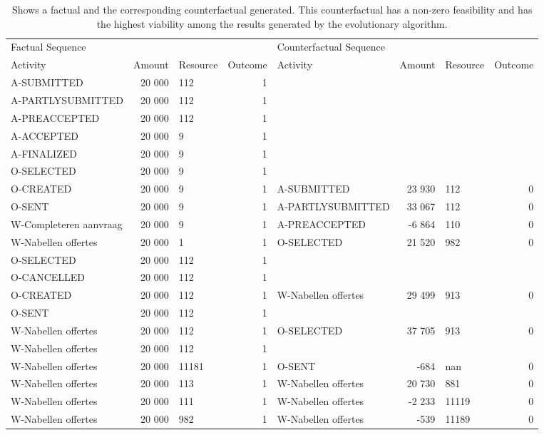 \begin{table}
\caption{Shows a factual and the corresponding counterfactual generated. This counterfactual has a non-zero feasibility and has the highest viability among the results generated by the evolutionary algorithm.}
\label{tbl:example-cf-evo-feasibility}
\begin{tabular}{lrlrlrlr}
\toprule
\multicolumn{4}{l}{Factual Sequence} & \multicolumn{4}{l}{Counterfactual Sequence} \\
Activity & Amount & Resource & Outcome & Activity & Amount & Resource & Outcome \\
\midrule
A-SUBMITTED & 20 000 & 112 & 1 &  &  &  &  \\
A-PARTLYSUBMITTED & 20 000 & 112 & 1 &  &  &  &  \\
A-PREACCEPTED & 20 000 & 112 & 1 &  &  &  &  \\
A-ACCEPTED & 20 000 & 9 & 1 &  &  &  &  \\
A-FINALIZED & 20 000 & 9 & 1 &  &  &  &  \\
O-SELECTED & 20 000 & 9 & 1 &  &  &  &  \\
O-CREATED & 20 000 & 9 & 1 & A-SUBMITTED & 23 930 & 112 & 0 \\
O-SENT & 20 000 & 9 & 1 & A-PARTLYSUBMITTED & 33 067 & 112 & 0 \\
W-Completeren aanvraag & 20 000 & 9 & 1 & A-PREACCEPTED & -6 864 & 110 & 0 \\
W-Nabellen offertes & 20 000 & 1 & 1 & O-SELECTED & 21 520 & 982 & 0 \\
O-SELECTED & 20 000 & 112 & 1 &  &  &  &  \\
O-CANCELLED & 20 000 & 112 & 1 &  &  &  &  \\
O-CREATED & 20 000 & 112 & 1 & W-Nabellen offertes & 29 499 & 913 & 0 \\
O-SENT & 20 000 & 112 & 1 &  &  &  &  \\
W-Nabellen offertes & 20 000 & 112 & 1 & O-SELECTED & 37 705 & 913 & 0 \\
W-Nabellen offertes & 20 000 & 112 & 1 &  &  &  &  \\
W-Nabellen offertes & 20 000 & 11181 & 1 & O-SENT & -684 & nan & 0 \\
W-Nabellen offertes & 20 000 & 113 & 1 & W-Nabellen offertes & 20 730 & 881 & 0 \\
W-Nabellen offertes & 20 000 & 111 & 1 & W-Nabellen offertes & -2 233 & 11119 & 0 \\
W-Nabellen offertes & 20 000 & 982 & 1 & W-Nabellen offertes & -539 & 11189 & 0 \\

\end{tabular}
\end{table}
